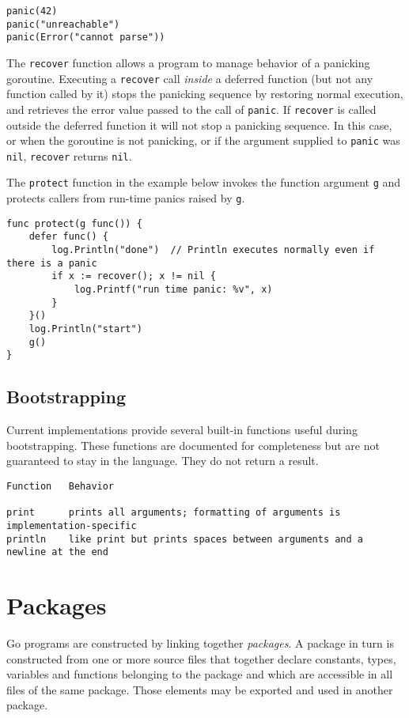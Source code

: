 {\begin{Verbatim}[frame=single]
panic(42)
panic("unreachable")
panic(Error("cannot parse"))
\end{Verbatim}

The \texttt{recover} function allows a program to manage behavior of a
panicking goroutine. Executing a \texttt{recover} call \emph{inside} a
deferred function (but not any function called by it) stops the
panicking sequence by restoring normal execution, and retrieves the
error value passed to the call of \texttt{panic}. If \texttt{recover} is
called outside the deferred function it will not stop a panicking
sequence. In this case, or when the goroutine is not panicking, or if
the argument supplied to \texttt{panic} was \texttt{nil},
\texttt{recover} returns \texttt{nil}.

The \texttt{protect} function in the example below invokes the function
argument \texttt{g} and protects callers from run-time panics raised by
\texttt{g}.

\begin{Verbatim}[frame=single]
func protect(g func()) {
    defer func() {
        log.Println("done")  // Println executes normally even if there is a panic
        if x := recover(); x != nil {
            log.Printf("run time panic: %v", x)
        }
    }()
    log.Println("start")
    g()
}
\end{Verbatim}

\subsection*{Bootstrapping}

Current implementations provide several built-in functions useful during
bootstrapping. These functions are documented for completeness but are
not guaranteed to stay in the language. They do not return a result.

\begin{Verbatim}[frame=single]
Function   Behavior

print      prints all arguments; formatting of arguments is implementation-specific
println    like print but prints spaces between arguments and a newline at the end
\end{Verbatim}

\section*{Packages}

Go programs are constructed by linking together \emph{packages}. A
package in turn is constructed from one or more source files that
together declare constants, types, variables and functions belonging to
the package and which are accessible in all files of the same package.
Those elements may be exported and
used in another package.

}
